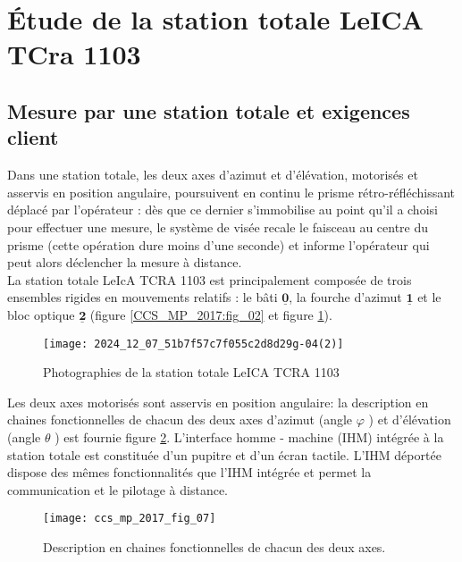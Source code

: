 \section{Étude de la station totale LeICA TCra 1103 \label{CCS_MP_2017:p4}}
\subsection{Mesure par une station totale et exigences client}
Dans une station totale, les deux axes d'azimut et d'élévation, motorisés et asservis en position angulaire, poursuivent en continu le prisme rétro-réfléchissant déplacé par l'opérateur : dès que ce dernier s'immobilise au point qu'il a choisi pour effectuer une mesure, le système de visée recale le faisceau au centre du prisme (cette opération dure moins d'une seconde) et informe l'opérateur qui peut alors déclencher la mesure à distance.\\
La station totale LeIcA TCRA 1103 est principalement composée de trois ensembles rigides en mouvements relatifs : le bâti $\underline{\mathbf{0}}$, la fourche d'azimut $\underline{\mathbf{1}}$ et le bloc optique $\underline{\mathbf{2}}$ (figure \ref{CCS_MP_2017:fig_02} et figure \ref{CCS_MP_2017:fig_06}).\\

\begin{figure}[!h]
\centering
\texttt{[image: 2024\_12\_07\_51b7f57c7f055c2d8d29g-04(2)]}

\caption{Photographies de la station totale LeICA TCRA 1103 \label{CCS_MP_2017:fig_06}}
\end{figure}

Les deux axes motorisés sont asservis en position angulaire: la description en chaines fonctionnelles de chacun des deux axes d'azimut (angle $\varphi$ ) et d'élévation (angle $\theta$ ) est fournie figure \ref{CCS_MP_2017:fig_07}. L'interface homme - machine (IHM) intégrée à la station totale est constituée d'un pupitre et d'un écran tactile. L'IHM déportée dispose des mêmes fonctionnalités que l'IHM intégrée et permet la communication et le pilotage à distance.\\

\begin{figure}[!h]
\centering
\texttt{[image: ccs\_mp\_2017\_fig\_07]}

\caption{Description en chaines fonctionnelles de chacun des deux axes.
\label{CCS_MP_2017:fig_07}}
\end{figure}

